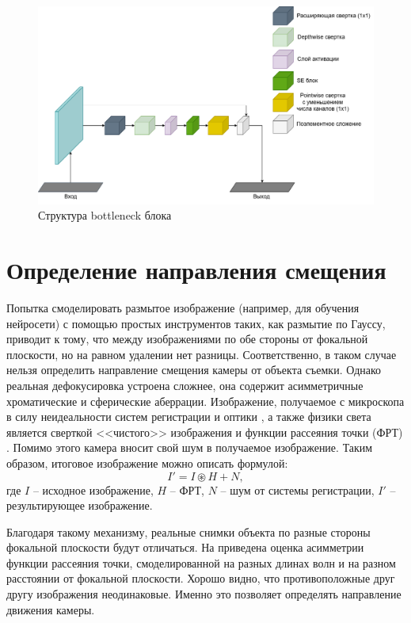 \begin{figure}[ht] 
	\center
	\includegraphics [scale=0.4] {my_folder/images/FocusNet-Bottleneck.png}
	\caption{Структура bottleneck блока}
	\label{fig:FocusNet-Bottleneck}
\end{figure}

\section{Определение направления смещения}
Попытка смоделировать размытое изображение (например, для обучения нейросети) с помощью простых инструментов таких, как размытие по Гауссу, приводит к тому, что между изображениями по обе стороны от фокальной плоскости, но на равном удалении нет разницы. Соответственно, в таком случае нельзя определить направление смещения камеры от объекта съемки. Однако реальная дефокусировка устроена сложнее, она содержит асимметричные хроматические и сферические аберрации. Изображение, получаемое с микроскопа в силу неидеальности систем регистрации и оптики , а также физики света является сверткой <<чистого>> изображения и функции рассеяния точки (ФРТ) \cite{sibarita2005deconvolution}. Помимо этого камера вносит свой шум в получаемое изображение. Таким образом, итоговое изображение можно описать формулой:
\begin{equation}
	I'=I \circledast H + N,
	\label{eq:res_img_with_PSF}
\end{equation}
где $I$ -- исходное изображение, $H$ -- ФРТ, $N$ -- шум от системы регистрации, $I'$ -- результирующее изображение.

Благодаря такому механизму, реальные снимки объекта по разные стороны фокальной плоскости будут отличаться. На  приведена оценка  асимметрии функции рассеяния точки, смоделированной на разных длинах волн и на разном расстоянии от фокальной плоскости. Хорошо видно, что противоположные друг другу изображения неодинаковые. Именно это позволяет определять направление движения камеры.

